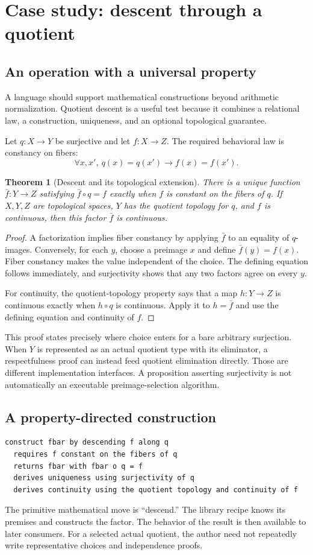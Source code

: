 \documentclass[11pt,a4paper]{article}
\newtheorem{theorem}{Theorem}[section]
\theoremstyle{definition}\newtheorem{definition}[theorem]{Definition}
\theoremstyle{remark}\newtheorem{remark}[theorem]{Remark}
\begin{document}
\section{Case study: descent through a quotient}
\label{sec:quotient}
\subsection{An operation with a universal property}
A language should support mathematical constructions beyond arithmetic normalization. Quotient descent is a useful test because it combines a relational law, a construction, uniqueness, and an optional topological guarantee.

Let $q:X\to Y$ be surjective and let $f:X\to Z$. The required behavioral law is constancy on fibers:
\[
 \forall x,x',\ q(x)=q(x')\to f(x)=f(x').
\]
\begin{theorem}[Descent and its topological extension]
There is a unique function $\bar f:Y\to Z$ satisfying $\bar f\circ q=f$ exactly when $f$ is constant on the fibers of $q$. If $X,Y,Z$ are topological spaces, $Y$ has the quotient topology for $q$, and $f$ is continuous, then this factor $\bar f$ is continuous.
\end{theorem}
\begin{proof}
A factorization implies fiber constancy by applying $\bar f$ to an equality of $q$-images. Conversely, for each $y$, choose a preimage $x$ and define $\bar f(y)=f(x)$. Fiber constancy makes the value independent of the choice. The defining equation follows immediately, and surjectivity shows that any two factors agree on every $y$.

For continuity, the quotient-topology property says that a map $h:Y\to Z$ is continuous exactly when $h\circ q$ is continuous. Apply it to $h=\bar f$ and use the defining equation and continuity of $f$.
\end{proof}

This proof states precisely where choice enters for a bare arbitrary surjection. When $Y$ is represented as an actual quotient type with its eliminator, a respectfulness proof can instead feed quotient elimination directly. Those are different implementation interfaces. A proposition asserting surjectivity is not automatically an executable preimage-selection algorithm.

\subsection{A property-directed construction}
\begin{lstlisting}
construct fbar by descending f along q
  requires f constant on the fibers of q
  returns fbar with fbar o q = f
  derives uniqueness using surjectivity of q
  derives continuity using the quotient topology and continuity of f
\end{lstlisting}
The primitive mathematical move is ``descend.'' The library recipe knows its premises and constructs the factor. The behavior of the result is then available to later consumers. For a selected actual quotient, the author need not repeatedly write representative choices and independence proofs.
\end{document}
